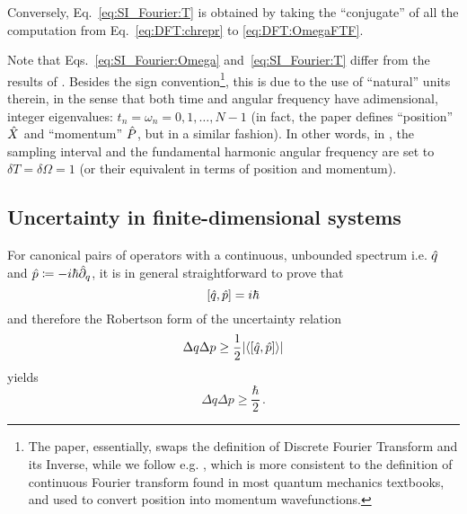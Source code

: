 Conversely, Eq.~\eqref{eq:SI_Fourier:T} is obtained by
taking the ``conjugate'' of all the computation
from Eq.~\eqref{eq:DFT:chrepr} to \eqref{eq:DFT:OmegaFTF}.

Note that Eqs.~\eqref{eq:SI_Fourier:Omega} and~\eqref{eq:SI_Fourier:T}
differ from the results of \cite{FiniteHilb}.
Besides the sign convention\footnote{
  The paper, essentially, swaps the definition of Discrete Fourier Transform and its Inverse,
  while we follow e.g. \cite[Sec. 7.6]{Folland:Fourier},
  which is more consistent to the definition of continuous Fourier transform
  found in most quantum mechanics textbooks,
  and used to
  convert position into momentum wavefunctions.
},
this is due to the use of
``natural'' units therein,
in the sense that
both time and angular frequency
have adimensional, integer eigenvalues:
$t_n = \omega_n = 0, 1, \dots, N-1$
(in fact, the paper defines ``position'' $\hat{X}$ and ``momentum'' $\hat{P}$,
but in a similar fashion).
In other words, in \citereset\cite{FiniteHilb}, the sampling interval and the fundamental harmonic angular frequency
are set to $\delta{T} = \delta{\Omega} = 1$ (or their equivalent in terms of position and momentum).




\subsection{Uncertainty in finite-dimensional systems}\label{sec:finite_uncertainty}
\citereset
For canonical pairs of operators with a continuous, unbounded spectrum i.e.
$\hat{q}$ and $\hat{p} \coloneqq -i\hbar\hat{\partial}_{q}$,
it is in general straightforward to prove that
\begin{equation}\label{eq:commconstant}
  \qty[\hat{q}, \hat{p}] = i\hbar
\end{equation}
and therefore
the Robertson form of the uncertainty relation
\begin{equation}\label{eq:robertsonconstant}
  \Delta q \Delta p \geq { \frac{1}{2} \qty|\ev{\qty[\op{q}, \op{p}]}| }
\end{equation}
yields
\begin{equation}\label{eq:min_uncertain_constant}
  \Delta q \Delta p \geq { \frac{\hbar}{2} } \, \text{.}
\end{equation}


